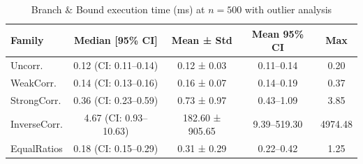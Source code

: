 \begin{table}[tb]
\centering
\caption{Branch $\&$ Bound execution time (ms) at $n=500$ with outlier analysis}
\label{tab:bb-time-n500}
\begin{tabular}{lcccc}
\toprule
Family & Median [95\% CI] & Mean ± Std & Mean 95\% CI & Max \\
\midrule
Uncorr. & 0.12 (CI: 0.11–0.14) & 0.12 ± 0.03 & 0.11–0.14 & 0.20 \\
WeakCorr. & 0.14 (CI: 0.13–0.16) & 0.16 ± 0.07 & 0.14–0.19 & 0.37 \\
StrongCorr. & 0.36 (CI: 0.23–0.59) & 0.73 ± 0.97 & 0.43–1.09 & 3.85 \\
InverseCorr. & 4.67 (CI: 0.93–10.63) & 182.60 ± 905.65 & 9.39–519.30 & 4974.48 \\
EqualRatios & 0.18 (CI: 0.15–0.29) & 0.31 ± 0.29 & 0.22–0.42 & 1.25 \\
\bottomrule
\end{tabular}
\end{table}
